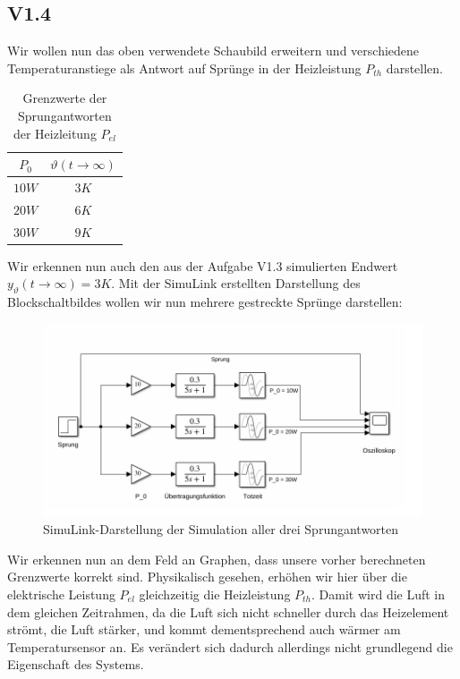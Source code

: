 \documentclass{report}
\begin{document}
\newpage

\subsection{V1.4}

Wir wollen nun das oben verwendete Schaubild erweitern und verschiedene Temperaturanstiege als Antwort auf Sprünge in der Heizleistung $P_{th}$ darstellen.
\begin{table}[h]
  \centering
  \begin{tabular}{|c|c|}
    \hline
    $P_{0}$ & $\vartheta(t \to \infty)$\\
    \hline
    $10W$ & $3K$ \\
    $20W$ & $6K$ \\
    $30W$ & $9K$ \\
    \hline
  \end{tabular}
  \caption{Grenzwerte der Sprungantworten der Heizleitung $P_{el}$}
  \label{tab:limpel}
\end{table}

Wir erkennen nun auch den aus der Aufgabe V1.3 simulierten Endwert $y_{\vartheta}(t\to\infty) = 3K$. Mit der SimuLink erstellten Darstellung des Blockschaltbildes wollen wir nun mehrere gestreckte Sprünge darstellen:

\begin{figure}[h]
  \centering
  \includegraphics[width=\textwidth]{../assets/images/RTP/rtp_1_V14.png}
  \caption{SimuLink-Darstellung der Simulation aller drei Sprungantworten}
  \label{fig:rtp1v14}
\end{figure}

\newpage

Wir erkennen nun an dem Feld an Graphen, dass unsere vorher berechneten Grenzwerte korrekt sind. Physikalisch gesehen, erhöhen wir hier über die elektrische Leistung $P_{el}$ gleichzeitig die Heizleistung $P_{th}$. Damit wird die Luft in dem gleichen Zeitrahmen, da die Luft sich nicht schneller durch das Heizelement strömt, die Luft stärker, und kommt dementsprechend auch wärmer am Temperatursensor an. Es verändert sich dadurch allerdings nicht grundlegend die Eigenschaft des Systems.
\end{document}
